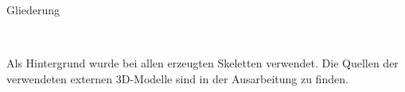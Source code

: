 \documentclass{beamer}
\begin{document}
\begin{frame}{Gliederung}
\begin{figure}
  ~
 \end{figure}
 \vfill
 \scriptsize Als Hintergrund wurde bei allen erzeugten Skeletten \cite{background} verwendet. Die Quellen der verwendeten externen 3D-Modelle sind in der Ausarbeitung zu finden.
\end{frame}


\end{document}
